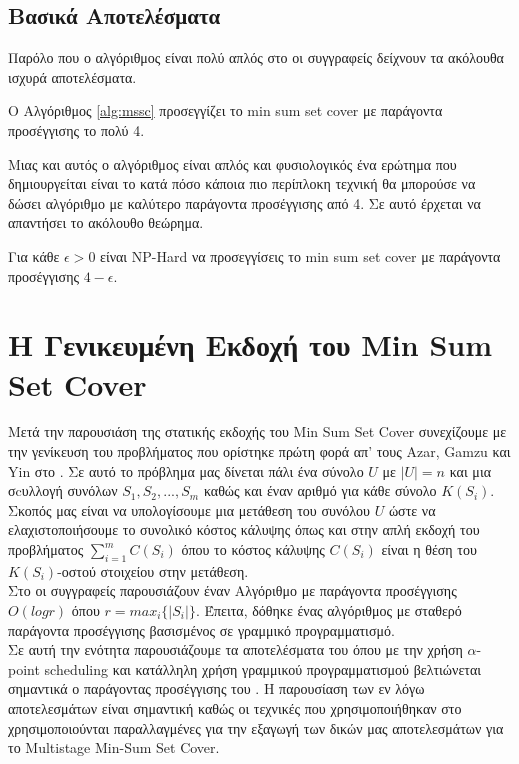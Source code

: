 \subsection{Βασικά Αποτελέσματα}

Παρόλο που ο αλγόριθμος είναι πολύ απλός στο \cite{FLT04} οι συγγραφείς δείχνουν τα ακόλουθα ισχυρά αποτελέσματα.

\begin{θεώρημα}\label{t:mssc_apx}
    Ο Αλγόριθμος \ref{alg:mssc} προσεγγίζει το min sum set cover με παράγοντα προσέγγισης το πολύ 4.
\end{θεώρημα}

Μιας και αυτός ο αλγόριθμος είναι απλός και φυσιολογικός ένα ερώτημα που δημιουργείται είναι το κατά πόσο κάποια πιο περίπλοκη τεχνική θα μπορούσε να δώσει αλγόριθμο με καλύτερο παράγοντα προσέγγισης από 4. Σε αυτό έρχεται να απαντήσει το ακόλουθο θεώρημα.

\begin{θεώρημα}\label{t:mssc_hardness}
    Για κάθε $\epsilon > 0$ είναι NP-Hard να προσεγγίσεις το min sum set cover με παράγοντα προσέγγισης $4-\epsilon$.
\end{θεώρημα}

\section{Η Γενικευμένη Εκδοχή του Min Sum Set Cover}

Μετά την παρουσιάση της στατικής εκδοχής του Min Sum Set Cover συνεχίζουμε με την γενίκευση του προβλήματος που ορίστηκε πρώτη φορά απ' τους Azar, Gamzu και Yin στο \cite{AGY09}. Σε αυτό το πρόβλημα μας δίνεται πάλι ένα σύνολο $U$ με $|U| = n$ και μια σcυλλογή συνόλων $S_1, S_2, ..., S_m$ καθώς και έναν αριθμό για κάθε σύνολο $K(S_i)$. Σκοπός μας είναι να υπολογίσουμε μια μετάθεση του συνόλου $U$ ώστε να ελαχιστοποιήσουμε το συνολικό κόστος κάλυψης όπως και στην απλή εκδοχή του προβλήματος $\sum_{i=1}^{m} C( S_i )$ όπου το κόστος κάλυψης $C(S_i)$ είναι η θέση του $K(S_i)$-οστού στοιχείου στην μετάθεση. \\

Στο \cite{AGY09} οι συγγραφείς παρουσιάζουν έναν Αλγόριθμο με παράγοντα προσέγγισης $O(logr)$ όπου $r = max_{i} \{ |S_i| \}$. Έπειτα, δόθηκε ένας αλγόριθμος με σταθερό παράγοντα προσέγγισης \cite{BGK10} βασισμένος σε γραμμικό προγραμματισμό. \\

Σε αυτή την ενότητα παρουσιάζουμε τα αποτελέσματα του \cite{SW11} όπου με την χρήση $\alpha$-point scheduling και κατάλληλη χρήση γραμμικού προγραμματισμού βελτιώνεται σημαντικά ο παράγοντας προσέγγισης του \cite{BGK10}. Η παρουσίαση των εν λόγω αποτελεσμάτων είναι σημαντική καθώς οι τεχνικές που χρησιμοποιήθηκαν στο \cite{SW11} χρησιμοποιούνται παραλλαγμένες για την εξαγωγή των δικών μας αποτελεσμάτων για το Multistage Min-Sum Set Cover. \\

